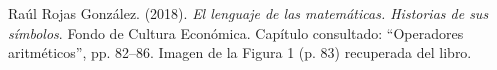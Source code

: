 \documentclass[11pt, a4paper]{article}
\begin{document}
\newpage

\begin{thebibliography}{99}
     Raúl Rojas González. (2018). \textit{El lenguaje de las matemáticas. Historias de sus símbolos}. Fondo de Cultura Económica. Capítulo consultado: “Operadores aritméticos”, pp. 82–86. Imagen de la Figura 1 (p. 83) recuperada del libro.
\end{thebibliography}
\end{document}
